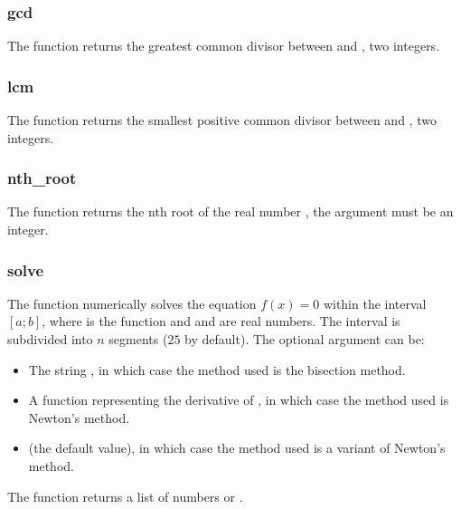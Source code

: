 \subsubsection{gcd}
The function  returns the greatest common divisor between  and , two integers.

\subsubsection{lcm}
The function  returns the smallest positive common divisor between  and , two integers.

\subsubsection{nth\_root}
The function  returns the nth root of the real number , the argument  must be an integer.

\subsubsection{solve}
The function  numerically solves the equation $f(x)=0$ within the interval $[a;b]$, where  is the function and  and  are real numbers. The interval is subdivided into $n$ segments ($25$ by default). The optional argument  can be:
\begin{itemize}
\item The string , in which case the method used is the bisection method. 
\item A function representing the derivative of , in which case the method used is Newton's method. 
\item \nil (the default value), in which case the method used is a variant of Newton's method.
\end{itemize}
The function returns a list of numbers or \nil.

